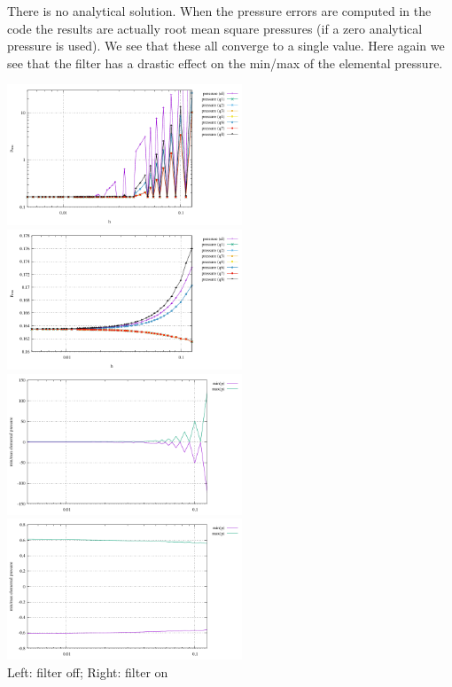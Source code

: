 There is no analytical solution. When the pressure errors are computed in the code
the results are actually root mean square pressures (if a zero analytical pressure 
is used). We see that these all converge to a single value.
Here again we see that the filter has a drastic effect on the min/max 
of the elemental pressure. 
\begin{center}
\includegraphics[width=7cm]{python_codes/fieldstone_12/results/rldc/prms_nofilter}
\includegraphics[width=7cm]{python_codes/fieldstone_12/results/rldc/prms_filter}\\
\includegraphics[width=7cm]{python_codes/fieldstone_12/results/rldc/rawp_nofilter}
\includegraphics[width=7cm]{python_codes/fieldstone_12/results/rldc/rawp_filter}\\
{\captionfont Left: filter off; Right: filter on}
\end{center}


